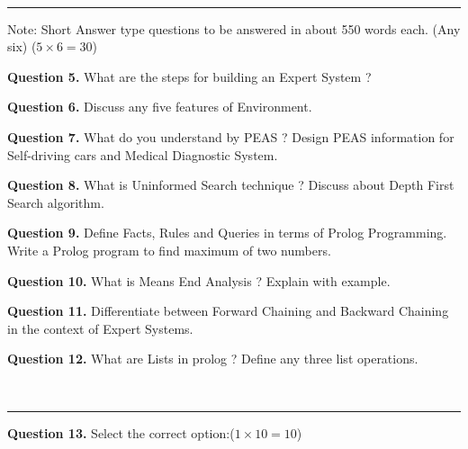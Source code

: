 \documentclass[11pt,a4paper]{article}
\begin{document}
\bigskip


\\[4pt]
\rule{\linewidth}{0.4pt}\smallskip

Note: Short Answer type questions to be answered in
about 550 words each. (Any six) ($5  \times 6 = 30$)

\medskip


\noindent   \textbf{Question 5.} What are the steps for building an Expert System ?

\medskip


\noindent   \textbf{Question 6.} Discuss any five features of Environment.

\medskip


\noindent   \textbf{Question 7.} What do you understand by PEAS ? Design PEAS
information for Self-driving cars and Medical
Diagnostic System.

\medskip


\noindent   \textbf{Question 8.} What is Uninformed Search technique ? Discuss about
Depth First Search algorithm.

\medskip


\noindent   \textbf{Question 9.} Define Facts, Rules and Queries in terms of Prolog
Programming. Write a Prolog program to find
maximum of two numbers.

\medskip


\noindent   \textbf{Question 10.} What is Means End Analysis ? Explain with example.

\medskip


\noindent   \textbf{Question 11.} Differentiate between Forward Chaining and
Backward Chaining in the context of Expert Systems.

\medskip


\noindent   \textbf{Question 12.} What are Lists in prolog ? Define any three list
operations.

\bigskip


\\[4pt]
\rule{\linewidth}{0.4pt}\smallskip

\medskip


\noindent   \textbf{Question 13.} Select the correct option:\hfill ($1  \times 10 = 10$)
\end{document}
